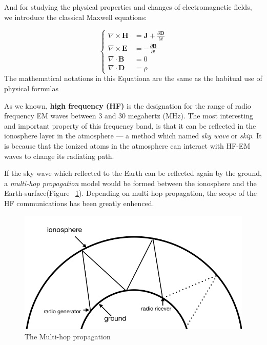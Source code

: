 \documentclass{mcmthesis}
\begin{document}
      And for studying the physical properties and changes of electromagnetic fields, we introduce the classical Maxwell equations:


      \begin{equation}\label{eq:Maxwell_new}
      \left\{
      \begin{aligned} %
          \nabla \times \textbf{H}  &= \textbf{J} + \frac{\partial\textbf{D}}{\partial t}       \\
          \nabla \times \textbf{E}  &= -\frac{\partial\textbf{B}}{\partial t}       \\
          \nabla   \cdot  \textbf{B}  &= 0       \\
          \nabla   \cdot  \textbf{D}  &= \rho
      \end{aligned}
      \right.
      \end{equation}
      The mathematical notations in this Equationa are the same as the habitual use of physical formulas


      As we known, \textbf{high frequency (HF)} is the designation for the range of radio frequency EM waves between 3 and 30 megahertz (MHz). The most interesting and important property of this frequency band, is that it can be reflected in the ionosphere layer in the atmosphere — a method which named \emph{sky wave} or \emph{skip}. It is because that the ionized atoms in the atmosphere can interact with HF-EM waves to change its radiating path.\cite{HF_EM}

      If the sky wave which reflected to the Earth can be reflected again by the ground, a \emph{multi-hop propagation} model would be formed between the ionosphere and the Earth-surface(Figure ~\ref{fig:Multi_hop}). Depending on multi-hop propagation, the scope of the HF communications has been greatly enhenced.

      \begin{figure}[ht]
      \centering
      \includegraphics[scale=0.5]{Multi_hop}
      \caption{The Multi-hop propagation}
      \label{fig:Multi_hop}
      \end{figure}
\end{document}
